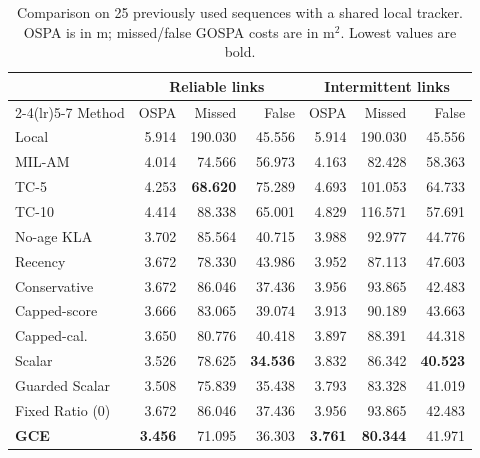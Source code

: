 \begin{table}[t]
\centering\small
\vspace*{5pt}
\caption{Comparison on 25 previously used sequences with a shared local tracker. OSPA is in m; missed/false GOSPA costs are in m$^2$. Lowest values are bold.}
\label{tab:main}
\setlength{\tabcolsep}{6pt}
\begin{tabular*}{\textwidth}{@{\extracolsep{\fill}}lrrrrrr@{}}
\toprule
& \multicolumn{3}{c}{Reliable links} & \multicolumn{3}{c}{Intermittent links} \\
\cmidrule(lr){2-4}\cmidrule(lr){5-7}
Method & OSPA & Missed & False & OSPA & Missed & False \\
\midrule
Local & 5.914 & 190.030 & 45.556 & 5.914 & 190.030 & 45.556 \\
MIL-AM & 4.014 & 74.566 & 56.973 & 4.163 & 82.428 & 58.363 \\
TC-5 & 4.253 & \textbf{68.620} & 75.289 & 4.693 & 101.053 & 64.733 \\
TC-10 & 4.414 & 88.338 & 65.001 & 4.829 & 116.571 & 57.691 \\
\midrule
No-age KLA & 3.702 & 85.564 & 40.715 & 3.988 & 92.977 & 44.776 \\
Recency & 3.672 & 78.330 & 43.986 & 3.952 & 87.113 & 47.603 \\
Conservative & 3.672 & 86.046 & 37.436 & 3.956 & 93.865 & 42.483 \\
Capped-score & 3.666 & 83.065 & 39.074 & 3.913 & 90.189 & 43.663 \\
Capped-cal. & 3.650 & 80.776 & 40.418 & 3.897 & 88.391 & 44.318 \\
Scalar & 3.526 & 78.625 & \textbf{34.536} & 3.832 & 86.342 & \textbf{40.523} \\
Guarded Scalar & 3.508 & 75.839 & 35.438 & 3.793 & 83.328 & 41.019 \\
Fixed Ratio (0) & 3.672 & 86.046 & 37.436 & 3.956 & 93.865 & 42.483 \\
\midrule
\textbf{GCE} & \textbf{3.456} & 71.095 & 36.303 & \textbf{3.761} & \textbf{80.344} & 41.971 \\
\bottomrule
\end{tabular*}
\end{table}
